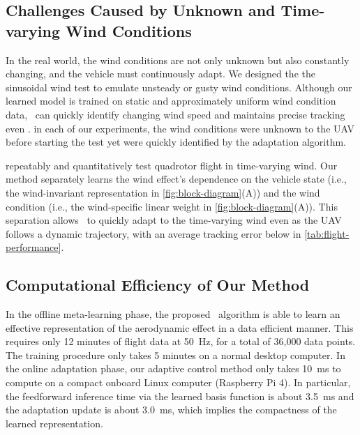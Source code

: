 \subsection*{Challenges Caused by Unknown and Time-varying Wind Conditions}
In the real world, the wind conditions are not only unknown but also constantly changing, and the vehicle must continuously adapt. We designed the the sinusoidal wind test to emulate unsteady or gusty wind conditions.
Although our learned model is trained on static and approximately uniform wind condition data, \nf~can quickly identify changing wind speed and maintains precise tracking even .
 in each of our experiments, the wind conditions were unknown to the UAV before starting the test yet were quickly identified by the adaptation algorithm. 

 repeatably and quantitatively test quadrotor flight in time-varying wind. Our method separately learns the wind effect's dependence on the vehicle state (i.e., the wind-invariant representation in \cref{fig:block-diagram}(A)) and the wind condition (i.e., the wind-specific linear weight in \cref{fig:block-diagram}(A)). This separation allows \nf~to quickly adapt to the time-varying wind even as the UAV follows a dynamic trajectory, with an average tracking error below  in \cref{tab:flight-performance}.  

\subsection*{Computational Efficiency of Our Method}
In the offline meta-learning phase, the proposed \DAML~algorithm is able to learn an effective representation of the aerodynamic effect in a data efficient manner. This requires only 12 minutes of flight data at \SI{50}{Hz}, for a total of 36,000 data points. The training procedure only takes 5 minutes on a normal desktop computer. In the online adaptation phase, our adaptive control method only takes \SI{10}{ms} to compute on a compact onboard Linux computer (Raspberry Pi 4). In particular, the feedforward inference time via the learned basis function is about \SI{3.5}{ms} and the adaptation update is about \SI{3.0}{ms}, which implies the compactness of the learned representation. %

